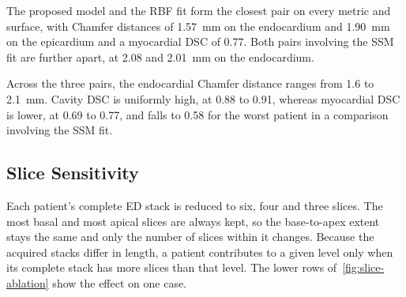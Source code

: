 The proposed model and the RBF fit form the closest pair on every metric and surface,
with Chamfer distances of 1.57~mm on the endocardium and 1.90~mm on the
epicardium and a myocardial DSC of 0.77. Both pairs involving the SSM fit are
further apart, at 2.08 and 2.01~mm on the endocardium.

Across the three pairs, the endocardial Chamfer distance ranges from 1.6 to
2.1~mm. Cavity DSC is uniformly high, at 0.88 to 0.91, whereas
myocardial DSC is lower, at 0.69 to 0.77, and falls to 0.58 for the
worst patient in a comparison involving the SSM fit.

\subsection{Slice Sensitivity}
\label{subsec:slice-sensitivity}
\noindent
Each patient's complete ED stack is reduced to six, four and three slices. The
most basal and most apical slices are always kept, so the base-to-apex extent
stays the same and only the number of slices within it changes. Because the
acquired stacks differ in length, a patient contributes to a given level only
when its complete stack has more slices than that level. The lower rows of~\cref{fig:slice-ablation} show the effect on one case.

